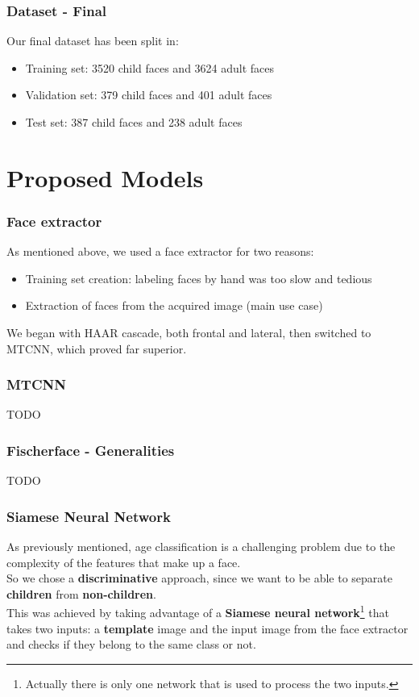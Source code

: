 \documentclass{beamer}
\begin{document}
	\begin{frame}
		\frametitle{Dataset - Final}
		Our final dataset has been split in:		
		\begin{itemize}
			\item Training set: 3520 child faces and 3624 adult faces
			\item Validation set: 379 child faces and 401 adult faces
			\item Test set: 387 child faces and 238 adult faces
		\end{itemize}
	\end{frame}

	\section{Proposed Models}
	
	\begin{frame}
		\frametitle{Face extractor}
		As mentioned above, we used a face extractor for two reasons:
		\begin{itemize}
			\item Training set creation: labeling faces by hand was too slow and tedious
			\item Extraction of faces from the acquired image (main use case)
		\end{itemize}
		We began with HAAR cascade, both frontal and lateral, then switched to MTCNN, which proved far superior.
	\end{frame}
	
	\begin{frame}
		\frametitle{MTCNN}
		TODO
	\end{frame}
	
	\begin{frame}
		\frametitle{Fischerface - Generalities}
		TODO
	\end{frame}
	
	\begin{frame}
		\frametitle{Siamese Neural Network}
		As previously mentioned, age classification is a challenging problem due to the complexity of the features that make up a face.\\
		So we chose a \textbf{discriminative} approach, since we want to be able to separate \textbf{children} from \textbf{non-children}. \\
		This was achieved by taking advantage of a \textbf{Siamese neural network}\footnote{Actually there is only one network that is used to process the two inputs.} that takes two inputs: a \textbf{template} image and the input image from the face extractor and checks if they belong to the same class or not. 	
	\end{frame}
	
\end{document}
